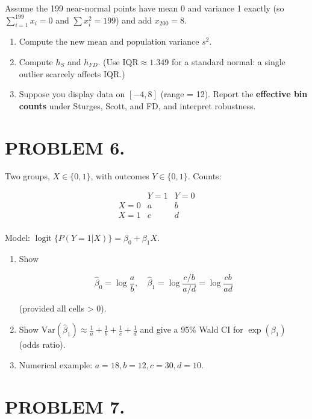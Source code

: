 \documentclass[12pt]{article}
\DeclareMathOperator{\logit}{logit}
\begin{document}
Assume the 199 near-normal points have mean 0 and variance 1 exactly (so \(\sum_{i=1}^{199}x_{i}=0\) and \(\sum x_{i}^{2}=199\)) and add \(x_{200}=8\).

\begin{enumerate}
\item[(a)] Compute the new mean and population variance \(s^{2}\).
\item[(b)] Compute \(h_{S}\) and \(h_{FD}\). (Use \(\mathrm{IQR}\approx 1.349\) for a standard normal: a single outlier scarcely affects IQR.)
\item[(c)] Suppose you display data on \([-4,8]\) (range = 12). Report the \textbf{effective bin counts} under Sturges, Scott, and FD, and interpret robustness.
\end{enumerate}

\newpage

\section*{PROBLEM 6.}

Two groups, \(X \in \{0,1\}\), with outcomes \(Y \in \{0,1\}\). Counts:

\[\begin{array}{c|cc}
& Y = 1 & Y = 0 \\
\hline
X = 0 & a & b \\
X = 1 & c & d \\
\end{array}\]

Model: \(\logit\{P(Y = 1 | X)\} = \beta_0 + \beta_1 X\).

\begin{enumerate}
\item[(a)] Show

\[\hat{\beta}_0 = \log \frac{a}{b}, \quad \hat{\beta}_1 = \log \frac{c/b}{a/d} = \log \frac{cb}{ad}\]

(provided all cells > 0).

\item[(b)] Show \(\text{Var}(\hat{\beta}_1) \approx \frac{1}{a} + \frac{1}{b} + \frac{1}{c} + \frac{1}{d}\) and give a 95\% Wald CI for \(\exp(\beta_1)\) (odds ratio).

\item[(c)] Numerical example: \(a = 18, b = 12, c = 30, d = 10\).
\end{enumerate}

\section*{PROBLEM 7.}
\end{document}
